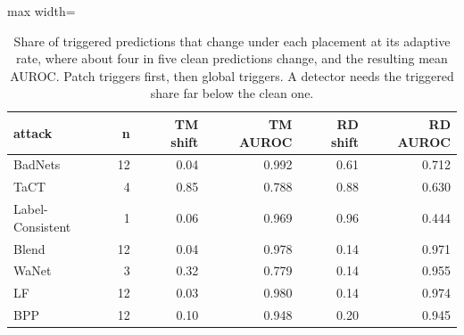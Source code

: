 \begin{table}[htbp]
\centering
\small
\caption{Share of triggered predictions that change under each placement at its adaptive rate, where about four in five clean predictions change, and the resulting mean AUROC. Patch triggers first, then global triggers. A detector needs the triggered share far below the clean one.}
\label{tab:survival}
\begin{adjustbox}{max width=\linewidth}
\begin{tabular}{lrrrrr}
\toprule
attack & n & TM shift & TM AUROC & RD shift & RD AUROC \\
\midrule
BadNets & 12 & 0.04 & 0.992 & 0.61 & 0.712 \\
TaCT & 4 & 0.85 & 0.788 & 0.88 & 0.630 \\
Label-Consistent & 1 & 0.06 & 0.969 & 0.96 & 0.444 \\
Blend & 12 & 0.04 & 0.978 & 0.14 & 0.971 \\
WaNet & 3 & 0.32 & 0.779 & 0.14 & 0.955 \\
LF & 12 & 0.03 & 0.980 & 0.14 & 0.974 \\
BPP & 12 & 0.10 & 0.948 & 0.20 & 0.945 \\
\bottomrule
\end{tabular}
\end{adjustbox}
\end{table}
